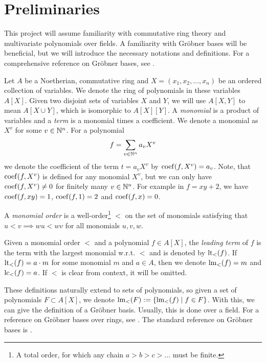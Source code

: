 \section{Preliminaries}
This project will assume familiarity with commutative ring theory and multivariate polynomials over fields. A familiarity with Gröbner bases will be beneficial, but we will introduce the necessary notations and definitions. For a comprehensive reference on Gröbner bases, see \cite{IVA}.

Let $A$ be a Noetherian, commutative ring and $X = (x_{1}, x_{2}, \dots, x_{n})$ be an ordered collection of variables. We denote the ring of polynomials in these variables $A[X]$. Given two disjoint sets of variables $X$ and $Y$, we will use $A[X, Y]$ to mean $A[X \cup Y]$, which is isomorphic to $A[X][Y]$. A \textit{monomial} is a product of variables and a \textit{term} is a monomial times a coefficient. We denote a monomial as $X^{v}$ for some $v \in \mathbb{N}^{n}$. For a polynomial \[f = \sum_{v \in \mathbb{N}^{n}} a_{v}X^{v}\] we denote the coefficient of the term $t = a_{v}X^{v}$ by $\operatorname{coef}(f, X^{v}) = a_{v}$. Note, that $\operatorname{coef}(f, X^{v})$ is defined for any monomial $X^{v}$, but we can only have $\operatorname{coef}(f, X^{v}) \neq 0$ for finitely many $v \in \mathbb{N}^{n}$. For example in $f = xy + 2$, we have $\operatorname{coef}(f, xy) = 1$, $\operatorname{coef}(f, 1) = 2$ and $\operatorname{coef}(f, x) = 0$.

\begin{definition}
  A \textit{monomial order} is a well-order\footnote{A total order, for which any chain $a > b > c > \dots$ must be finite.} $<$ on the set of monomials satisfying that $u < v \implies wu < wv$ for all monomials $u, v, w$.

  Given a monomial order $<$ and a polynomial $f \in A[X]$, the \textit{leading term} of $f$ is the term with the largest monomial w.r.t. $<$ and is denoted by $\operatorname{lt}_{<}(f)$. If $\operatorname{lt}_{<}(f) = a\cdot m$ for some monomial $m$ and $a \in A$, then we denote $\operatorname{lm}_{<}(f) = m$ and $\operatorname{lc}_{<}(f) = a$. If $<$ is clear from context, it will be omitted.
\end{definition}

These definitions naturally extend to sets of polynomials, so given a set of polynomials $F \subset A[X]$, we denote $\operatorname{lm}_{<}(F) := \{\operatorname{lm}_{<}(f) \mid f \in F\}$. With this, we can give the definition of a Gröbner basis. Usually, this is done over a field. For a reference on Gröbner bases over rings, see \cite{loustaunau1994introduction}. The standard reference on Gröbner bases is \cite{IVA}.

